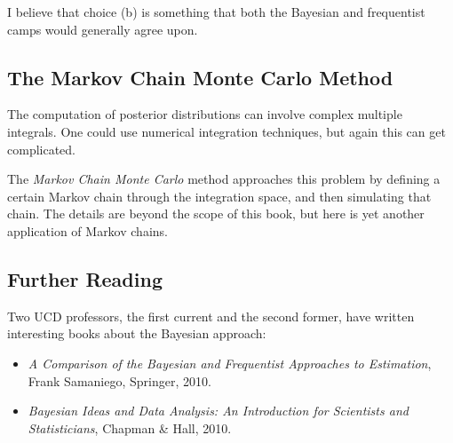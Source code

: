 I believe that choice (b) is something that both the Bayesian and
frequentist camps would generally agree upon.

\subsection{The Markov Chain Monte Carlo Method}

The computation of posterior distributions can involve complex multiple
integrals.  One could use numerical integration techniques, but again
this can get complicated.

The {\it Markov Chain Monte Carlo} method approaches this problem by
defining a certain Markov chain through the integration space, and then
simulating that chain.  The details are beyond the scope of this book,
but here is yet another application of Markov chains.

\subsection{Further Reading}

Two UCD professors, the first current and the second former, have
written interesting books about the Bayesian approach:

\begin{itemize}

\item {\it A Comparison of the Bayesian and Frequentist Approaches to
Estimation}, Frank Samaniego, Springer, 2010.

\item {\it Bayesian Ideas and Data Analysis: An Introduction for Scientists
and Statisticians}, Chapman \& Hall, 2010.

\end{itemize}


